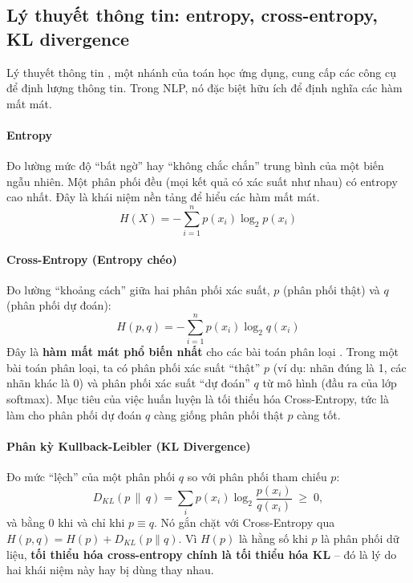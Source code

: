 \subsection{Lý thuyết thông tin: entropy, cross-entropy, KL divergence}
\label{ssec:ly_thuyet_thong_tin}
Lý thuyết thông tin \cite{shannon1948mathematical}, một nhánh của toán học ứng dụng, cung cấp các công cụ để định lượng thông tin. Trong NLP, nó đặc biệt hữu ích để định nghĩa các hàm mất mát.

\paragraph{Entropy}
Đo lường mức độ “bất ngờ” hay “không chắc chắn” trung bình của một biến ngẫu nhiên. Một phân phối đều (mọi kết quả có xác suất như nhau) có entropy cao nhất. Đây là khái niệm nền tảng để hiểu các hàm mất mát.
\begin{equation}
    H(X) = -\sum_{i=1}^{n} p(x_i) \log_2 p(x_i)
    \label{eq:entropy}
\end{equation}

\paragraph{Cross-Entropy (Entropy chéo)}
Đo lường “khoảng cách” giữa hai phân phối xác suất, $p$ (phân phối thật) và $q$ (phân phối dự đoán):
\begin{equation}
    H(p, q) = -\sum_{i=1}^{n} p(x_i) \log_2 q(x_i)
    \label{eq:cross_entropy}
\end{equation}
Đây là \textbf{hàm mất mát phổ biến nhất} cho các bài toán phân loại \cite{goodfellow2016deep}. Trong một bài toán phân loại, ta có phân phối xác suất “thật” $p$ (ví dụ: nhãn đúng là 1, các nhãn khác là 0) và phân phối xác suất “dự đoán” $q$ từ mô hình (đầu ra của lớp softmax). Mục tiêu của việc huấn luyện là tối thiểu hóa Cross-Entropy, tức là làm cho phân phối dự đoán $q$ càng giống phân phối thật $p$ càng tốt.

\paragraph{Phân kỳ Kullback-Leibler (KL Divergence)}
Đo mức “lệch” của một phân phối $q$ so với phân phối tham chiếu $p$:
\begin{equation}
    D_{KL}(p \,\|\, q) = \sum_{i} p(x_i) \log_2 \frac{p(x_i)}{q(x_i)} \;\ge\; 0 ,
    \label{eq:kl}
\end{equation}
và bằng $0$ khi và chỉ khi $p \equiv q$. Nó gắn chặt với Cross-Entropy qua $H(p, q) = H(p) + D_{KL}(p \| q)$. Vì $H(p)$ là hằng số khi $p$ là phân phối dữ liệu, \textbf{tối thiểu hóa cross-entropy chính là tối thiểu hóa KL} -- đó là lý do hai khái niệm này hay bị dùng thay nhau.

